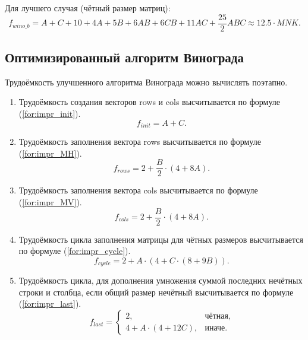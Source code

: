 Для лучшего случая (чётный размер матриц): 
\begin{equation}
\label{for:good}
f_{wino\_b} = A + C + 10 + 4A + 5B + 6AB + 6CB + 11AC + \frac{25}{2}ABC \approx 12.5 \cdot MNK.
\end{equation}

\subsection{Оптимизированный алгоритм Винограда}

Трудоёмкость улучшенного алгоритма Винограда можно вычислять поэтапно. 
\begin{enumerate}
	\item Трудоёмкость создания векторов rows и cols высчитывается по формуле (\ref{for:impr_init}).
	\begin{equation}
	\label{for:impr_init}
	f_{init} = A + C.
	\end{equation}
	
	\item Трудоёмкость заполнения вектора rows высчитывается по формуле (\ref{for:impr_MH}).
	\begin{equation}
	\label{for:impr_MH}
	f_{rows} = 2 + \frac{B}{2} \cdot (4 + 8A).
	\end{equation}
	
	\item Трудоёмкость заполнения вектора cols высчитывается по формуле (\ref{for:impr_MV}).
	\begin{equation}
	\label{for:impr_MV}
	f_{cols} = 2 + \frac{B}{2} \cdot (4 + 8A).
	\end{equation}
	
	\item Трудоёмкость цикла заполнения матрицы для чётных размеров высчитывается по формуле (\ref{for:impr_cycle}).
	\begin{equation}
	\label{for:impr_cycle}
	f_{cycle} = 2 + A \cdot (4 + C \cdot (8 + 9B)).
	\end{equation}
	
	\item Трудоёмкость цикла, для дополнения умножения суммой последних нечётных строки и столбца, если общий размер нечётный высчитывается по формуле (\ref{for:impr_last}).
	\begin{equation}
	\label{for:impr_last}
	f_{last} = 
	\begin{cases}
	2, & \text{чётная,}\\
	4 + A \cdot (4 + 12C), & \text{иначе.}
	\end{cases}
	\end{equation}
\end{enumerate}

